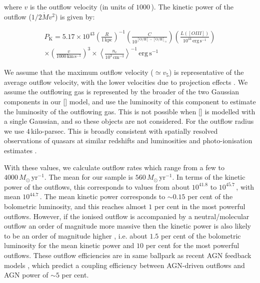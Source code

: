 \noindent where $v$ is the outflow velocity (in units of $1000$\,\kms).
The kinetic power of the outflow ($1/2\dot{M}v^2$) is given by: 

\begingroup\makeatletter{}\check@mathfonts
\begin{eqnarray}
P_{\text{K}} = 5.17 \times 10^{43} \left( \frac{R}{1\,\text{kpc}} \right)^{-1} \left( \frac{C}{10^{[\text{O/H}] - [\text{O/H}]_\odot}} \right) \left( \frac{L([OIII])}{10^{44}\, \text{erg}\,\text{s}^{-1}}\right) \nonumber \\ \times \left( \frac{v}{1000\,\text{km}\,\text{s}^{-1}}\right)^3 \times \left\langle \frac{n_e}{10^3\, \text{cm}^{-3}} \right\rangle^{-1} \, \text{erg}\,\text{s}^{-1}
\end{eqnarray}
\endgroup

\noindent We assume that the maximum outflow velocity ($\simeq v_{5}$) is representative of the average outflow velocity, with the lower velocities due to projection effects \citep{cano-diaz12}.
We assume the outflowing gas is represented by the broader of the two Gaussian components in our [] model, and use the luminosity of this component to estimate the luminosity of the outflowing gas. 
This is not possible when [] is modelled with a single Gaussian, and so these objects are not considered. 
For the outflow radius we use $4$\,kilo-parsec.
This is broadly consistent with spatially resolved observations of quasars at similar redshifts and luminosities \citep[e.g.][]{cano-diaz12,carniani15,brusa16} and photo-ionisation estimates \citep[e.g.][]{zakamska16}. 

With these values, we calculate outflow rates which range from a few to $4000\,M_\odot\,\text{yr}^{-1}$. 
The mean for our sample is $560\,M_\odot\,\text{yr}^{-1}$. 
In terms of the kinetic power of the outflows, this corresponds to values from about $10^{41.8}$ to $10^{45.7}$\,\ergs, with mean $10^{44.7}$\,\ergs. 
The mean kinetic power corresponds to $\sim0.15$ per cent of the bolometric luminosity, and this reaches almost $1$ per cent in the most powerful outflows.  
However, if the ionised outflow is accompanied by a neutral/molecular outflow an order of magnitude more massive then the kinetic power is also likely to be an order of magnitude higher \citep{cano-diaz12}, i.e. about $1.5$ per cent of the bolometric luminosity for the mean kinetic power and $10$ per cent for the most powerful outflows. 
These outflow efficiencies are in same ballpark as recent AGN feedback models \citep[e.g.][]{zubovas12}, which predict a coupling efficiency between AGN-driven outflows and AGN power of $\sim5$ per cent.

